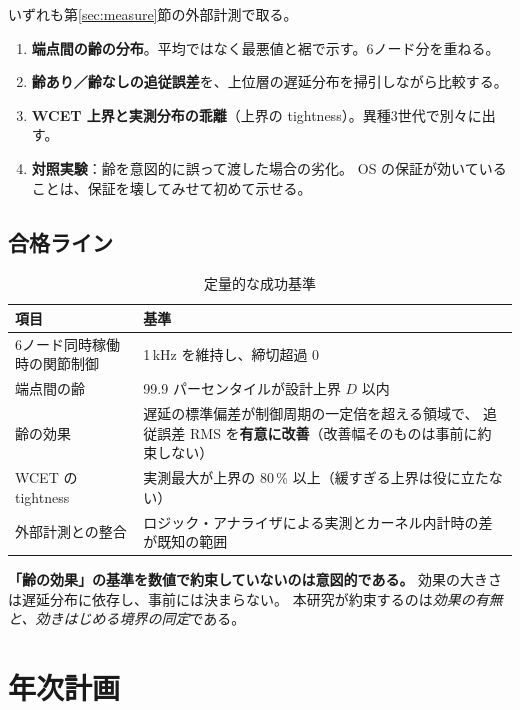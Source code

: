 \documentclass[11pt,a4paper]{article}
\newcommand{\keyp}[1]{\textbf{\textcolor{blue!45!black}{#1}}}
\begin{document}
いずれも第\ref{sec:measure}節の外部計測で取る。

\begin{enumerate}[leftmargin=1.6em,itemsep=3pt]
  \item \keyp{端点間の齢の分布}。平均ではなく最悪値と裾で示す。6ノード分を重ねる。
  \item \keyp{齢あり／齢なしの追従誤差}を、上位層の遅延分布を掃引しながら比較する。
  \item \keyp{WCET 上界と実測分布の乖離}（上界の tightness）。異種3世代で別々に出す。
  \item \keyp{対照実験}：齢を意図的に誤って渡した場合の劣化。
        OS の保証が効いていることは、保証を壊してみせて初めて示せる。
\end{enumerate}

\subsection{合格ライン}

\begin{table}[htbp]
\centering
\small
\caption{定量的な成功基準}
\begin{tabularx}{\textwidth}{@{}l X@{}}
\toprule
\textbf{項目} & \textbf{基準} \\
\midrule
6ノード同時稼働時の関節制御 & 1\,kHz を維持し、締切超過 0 \\
端点間の齢 & 99.9 パーセンタイルが設計上界 $D$ 以内 \\
齢の効果 & 遅延の標準偏差が制御周期の一定倍を超える領域で、
  追従誤差 RMS を\keyp{有意に改善}（改善幅そのものは事前に約束しない） \\
WCET の tightness & 実測最大が上界の 80\,\% 以上（緩すぎる上界は役に立たない） \\
外部計測との整合 & ロジック・アナライザによる実測とカーネル内計時の差が既知の範囲 \\
\bottomrule
\end{tabularx}
\end{table}

\noindent
\keyp{「齢の効果」の基準を数値で約束していないのは意図的である。}
効果の大きさは遅延分布に依存し、事前には決まらない。
本研究が約束するのは\emph{効果の有無と、効きはじめる境界の同定}である。

\section{年次計画}
\end{document}
